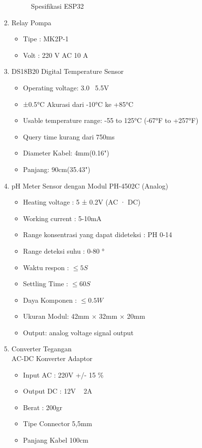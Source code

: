 \begin{enumerate}[label=(\alph*)]
\begin{figure}[ht]
  \caption{Spesifikasi ESP32 }%
  \label{fig:tabelsatu}
\end{figure}
	\item Relay Pompa
	\begin{itemize}
		\item Tipe : MK2P-1
		\item Volt : 220 V AC 10 A
	\end{itemize}
	\item DS18B20 Digital Temperature Sensor
	\begin{itemize}
		\item Operating voltage: 3.0~ 5.5V
		\item ±0.5°C Akurasi dari -10°C ke +85°C
		\item Usable temperature range: -55 to 125°C (-67°F to +257°F)
		\item Query time kurang dari 750ms
		\item Diameter Kabel: 4mm(0.16")
		\item Panjang: 90cm(35.43")
	\end{itemize}
	\item pH Meter Sensor dengan Modul PH-4502C (Analog)
	\begin{itemize}
		\item Heating voltage : 5 ± 0.2V (AC · DC)
		\item Working current : 5-10mA
		\item Range konsentrasi yang dapat dideteksi : PH 0-14
		\item Range deteksi suhu : 0-80 °
		\item Waktu respon :  $\leq 5S$
		\item Settling Time : $\leq 60S$
		\item Daya Komponen : $\leq 0.5W$
		\item Ukuran Modul: 42mm × 32mm × 20mm
		\item Output: analog voltage signal output
	\end{itemize}
	\item Converter Tegangan \\
	AC-DC Konverter Adaptor
	\begin{itemize}
		\item	Input AC : 220V +/- 15 \%
		\item	Output DC : 12V ~ 2A
		\item	Berat : 200gr
		\item	Tipe Connector 5,5mm
		\item	Panjang Kabel 100cm

\end{itemize}
\end{enumerate}
